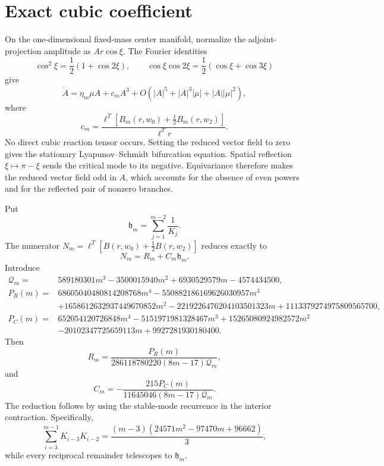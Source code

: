 \section*{Exact cubic coefficient}
On the one-dimensional fixed-mass center manifold, normalize the
adjoint-projection amplitude as $A r\cos\xi$.  The Fourier identities
\[
\cos^2\xi=\frac12(1+\cos2\xi),
\qquad
\cos\xi\cos2\xi=\frac12(\cos\xi+\cos3\xi)
\]
give
\[
\dot A=\eta_m\mu A+c_mA^3+
O(|A|^5+|A|^3|\mu|+|A||\mu|^2),
\]
where
\[
c_m=\frac{\ell^T\left[B_m(r,w_0)+\frac12B_m(r,w_2)\right]}{\ell^Tr}.
\]
No direct cubic reaction tensor occurs.
Setting the reduced vector field to zero gives the stationary
Lyapunov--Schmidt bifurcation equation.
Spatial reflection $\xi\mapsto\pi-\xi$ sends the critical mode to its
negative.  Equivariance therefore makes the reduced vector field odd in $A$,
which accounts for the absence of even powers and for the reflected pair of
nonzero branches.

Put
\[
\mathfrak h_m=\sum_{j=1}^{m-2}\frac1{K_j}.
\]
The numerator $N_m=\ell^T[B(r,w_0)+\tfrac12B(r,w_2)]$ reduces exactly to
\[
N_m=R_m+C_m\mathfrak h_m.
\]
Introduce
\begin{align*}
\mathcal Q_m={}&589180301m^3-3500015940m^2+6930529579m-4574434500,\\
P_R(m)={}&68605040480814208768m^4-550882186169626030957m^3\\
&+1658612632937449670852m^2-2219226476204103501323m
+1113379274975809565700,\\
P_C(m)={}&652054120726848m^4-5151971981328467m^3
+15265080924982572m^2\\
&-20102347725659113m+9927281930180400.
\end{align*}
Then
\[
R_m=\frac{P_R(m)}{286118780220(8m-17)\mathcal Q_m},
\]
and
\[
C_m=-\frac{215P_C(m)}{11645046(8m-17)\mathcal Q_m}.
\]
The reduction follows by using the stable-mode recurrence in the interior
contraction.  Specifically,
\[
\sum_{i=3}^{m-1}K_{i-3}K_{i-2}
=\frac{(m-3)(24571m^2-97470m+96662)}3,
\]
while every reciprocal remainder telescopes to $\mathfrak h_m$.
